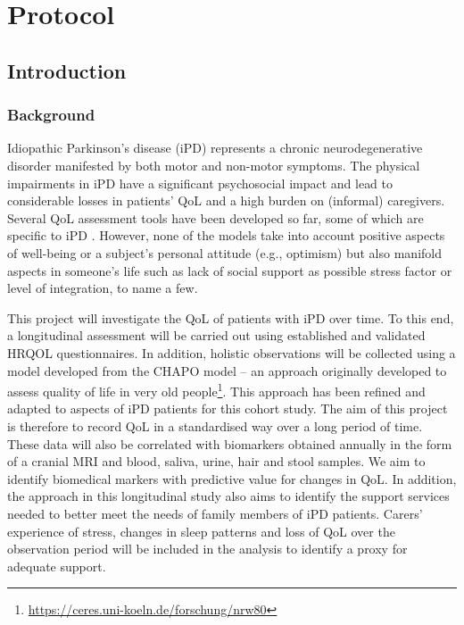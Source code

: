 \chapter{Protocol}
\section{Introduction}
\subsection{Background}
Idiopathic Parkinson's disease (\acs{iPD}) represents a chronic neurodegenerative disorder manifested by both motor and non-motor symptoms. The physical impairments in \ac{iPD} have a significant psychosocial impact and lead to considerable losses in patients'  \ac{QoL} and a high burden on (informal) caregivers. Several \ac{QoL} assessment tools have been developed so far, some of which are specific to \ac{iPD} \cite{stuhrenberg2022jpm}. However, none of the models take into account positive aspects of well-being or a subject's personal attitude (e.g., optimism) but also manifold aspects in someone's life such as lack of social support as possible stress factor or level of integration, to name a few.

This project will investigate the \ac{QoL} of patients with \ac{iPD} over time. To this end, a longitudinal assessment will be carried out using established and validated \ac{HRQOL} questionnaires. In addition, holistic observations will be collected using a model developed from the \textsc{CHAPO} model \citep{thieken2022jpd} -- an approach originally developed to assess quality of life in very old people\footnote{\url{https://ceres.uni-koeln.de/forschung/nrw80}}. This approach has been refined and adapted to aspects of \ac{iPD} patients for this cohort study. The aim of this project is therefore to record \ac{QoL} in a standardised way over a long period of time. These data will also be correlated with biomarkers obtained annually in the form of a cranial \ac{MRI} and blood, saliva, urine, hair and stool samples. We aim to identify biomedical markers with predictive value for changes in \ac{QoL}. In addition, the approach in this longitudinal study also aims to identify the support services needed to better meet the needs of family members of \ac{iPD} patients. Carers' experience of stress, changes in sleep patterns and loss of \ac{QoL} over the observation period will be included in the analysis to identify a proxy for adequate support.

